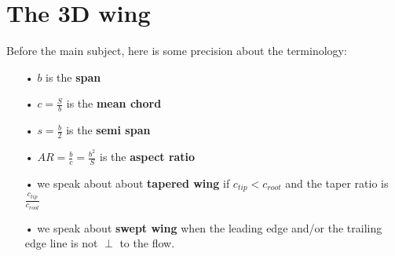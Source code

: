 
\chapter{The 3D wing}
	Before the main subject, here is some precision about the terminology:
	
	\begin{itemize}
	\item[•] $b$ is the \textbf{span}
	\item[•] $c = \frac{S}{b}$ is the \textbf{mean chord}
	\item[•] $s= \frac{b}{2}$ is the \textbf{semi span}
	\item[•] $AR = \frac{b}{c} = \frac{b^2}{S}$ is the \textbf{aspect ratio}
	\item[•] we speak about about \textbf{tapered wing} if $c_{tip} < c_{root}$ and the taper ratio is $\frac{c_{tip}}{c_{root}}$
	\item[•] we speak about \textbf{swept wing} when the leading edge and/or the trailing edge line is not $\perp$ to the flow. 
	\end{itemize}
	
